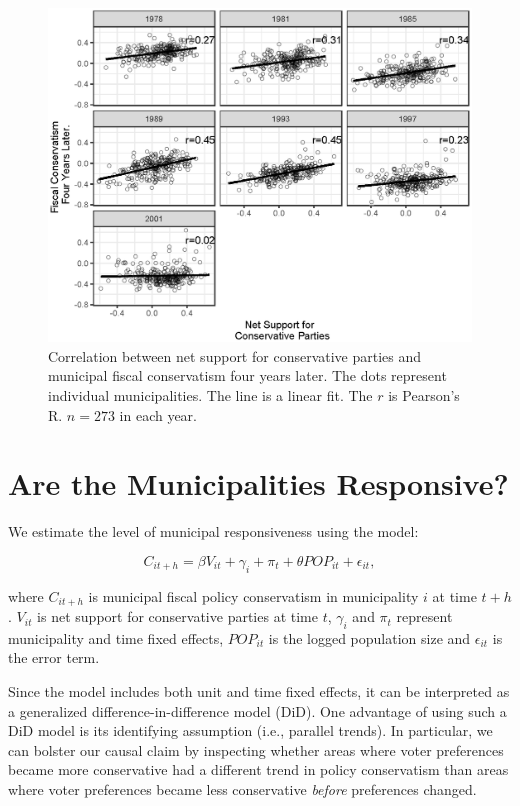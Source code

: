 \documentclass[a4paper,12pt]{article}
\begin{document}
\begin{figure}[htbp] 
	\centering
	
	\includegraphics[width=1\textwidth]{correlations_across_time.eps}
	\caption{Correlation between net support for conservative parties and municipal fiscal conservatism four years later. The dots represent individual municipalities. The line is a linear fit. The $r$ is Pearson's R.  $n=273$ in each year.}
	\label{figure:corr}
\end{figure}


\section{Are the Municipalities Responsive?}

We estimate the level of municipal responsiveness using the model:

\begin{equation*}
C_{it+h} =  \beta  V_{it} + \gamma_i +  \pi_t + \theta POP_{it}  +\epsilon_{it},
\end{equation*}

where $C_{it+h}$ is municipal fiscal policy conservatism in municipality $i$ at time $t+h$. $V_{it}$ is net support for conservative parties at time $t$, $\gamma_i$ and $\pi_t$ represent municipality and time fixed effects, $POP_{it}$ is the logged population size and $\epsilon_{it}$ is the error term.

Since the model includes both unit and time fixed effects, it can be interpreted as a generalized difference-in-difference model (DiD). One advantage of using such a  DiD model is its identifying assumption (i.e., parallel trends). In particular, we can bolster our causal claim by inspecting whether areas where voter preferences became more conservative had a different trend in policy conservatism than areas where voter preferences became less conservative \textit{before} preferences changed.  
\end{document}
